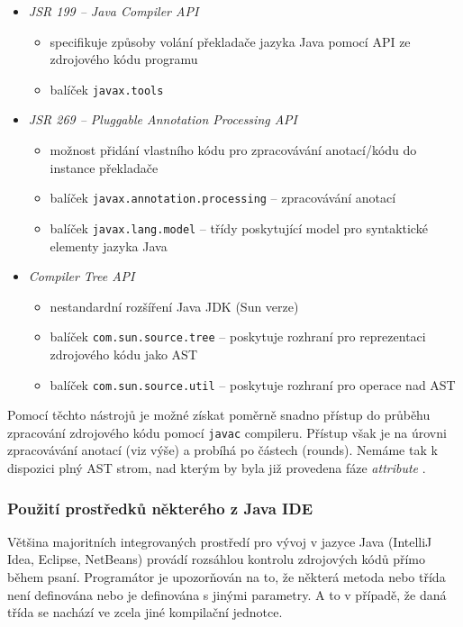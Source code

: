 \begin{itemize}
\item \emph{JSR 199 -- Java Compiler API}
  \begin{itemize}
  \item specifikuje způsoby volání překladače jazyka Java pomocí API ze zdrojového kódu programu
  \item balíček \verb+javax.tools+
  \end{itemize}
\item \emph{JSR 269 -- Pluggable Annotation Processing API}
  \begin{itemize}
  \item možnost přidání vlastního kódu pro zpracovávání anotací/kódu do instance překladače
  \item balíček \verb+javax.annotation.processing+ -- zpracovávání anotací
  \item balíček \verb+javax.lang.model+ -- třídy poskytující model pro syntaktické elementy jazyka Java
  \end{itemize}
\item \emph{Compiler Tree API} \cite{parsertools:compilertreeapi}
  \begin{itemize}
  \item nestandardní rozšíření Java JDK (Sun verze)
  \item balíček \verb+com.sun.source.tree+ -- poskytuje rozhraní pro reprezentaci zdrojového kódu jako AST
  \item balíček \verb+com.sun.source.util+ -- poskytuje rozhraní pro operace nad AST
  \end{itemize}
\end{itemize}

Pomocí těchto nástrojů je možné získat poměrně snadno přístup do průběhu zpracování zdrojového kódu pomocí \verb+javac+ compileru. Přístup však je na úrovni zpracovávání anotací (viz výše) a probíhá po částech (rounds). Nemáme tak k dispozici plný AST strom, nad kterým by byla již provedena fáze \emph{attribute} \cite{hackers_guide_to_javac}.

\subsubsection{Použití prostředků některého z Java IDE}
Většina majoritních integrovaných prostředí pro vývoj v jazyce Java (IntelliJ Idea, Eclipse, NetBeans) provádí rozsáhlou kontrolu zdrojových kódů přímo během psaní. Programátor je upozorňován na to, že některá metoda nebo třída není definována nebo je definována s jinými parametry. A to v případě, že daná třída se nachází ve zcela jiné kompilační jednotce.

